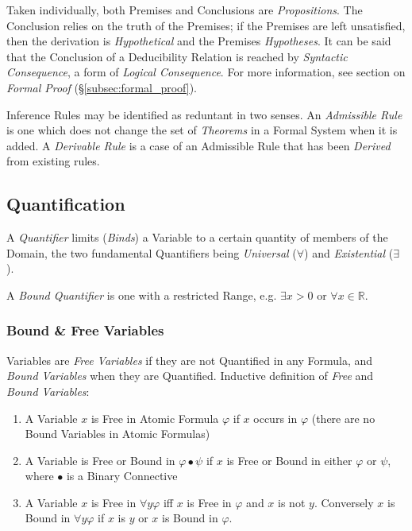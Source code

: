 \documentclass{article}
\begin{document}
Taken individually, both Premises and Conclusions are
\emph{Propositions}. The Conclusion relies on the truth of the
Premises; if the Premises are left unsatisfied, then the derivation is
\emph{Hypothetical} and the Premises \emph{Hypotheses}. It can be said
that the Conclusion of a Deducibility Relation is reached by
\emph{Syntactic Consequence}, a form of \emph{Logical
  Consequence}. For more information, see section on \emph{Formal
  Proof} (\S\ref{subsec:formal_proof}).

Inference Rules may be identified as reduntant in two senses. An
\emph{Admissible Rule} is one which does not change the set of
\emph{Theorems} in a Formal System when it is added. A \emph{Derivable
  Rule} is a case of an Admissible Rule that has been \emph{Derived}
from existing rules.



\subsection{Quantification}\label{subsec:firstorder_quantification}

A \emph{Quantifier} limits (\emph{Binds}) a Variable to a certain
quantity of members of the Domain, the two fundamental Quantifiers
being \emph{Universal} ($\forall$) and \emph{Existential} ($\exists$).

A \emph{Bound Quantifier} is one with a restricted Range, e.g.
$\exists x > 0$ or $\forall x \in \mathbb{R}$.



\subsubsection{Bound \& Free Variables}\label{subsec:bound_free}

Variables are \emph{Free Variables} if they are not Quantified in any
Formula, and \emph{Bound Variables} when they are Quantified.
Inductive definition of \emph{Free} and \emph{Bound Variables}:
\begin{enumerate}
\item A Variable $x$ is Free in Atomic Formula $\varphi$ if $x$ occurs
  in $\varphi$ (there are no Bound Variables in Atomic Formulas)
\item A Variable is Free or Bound in $\varphi \bullet \psi$ if $x$ is
  Free or Bound in either $\varphi$ or $\psi$, where $\bullet$ is a
  Binary Connective
\item A Variable $x$ is Free in $\forall y \varphi$ iff $x$ is Free in
  $\varphi$ and $x$ is not $y$. Conversely $x$ is Bound in $\forall y
  \varphi$ if $x$ is $y$ or $x$ is Bound in $\varphi$.
\end{enumerate}
\end{document}
